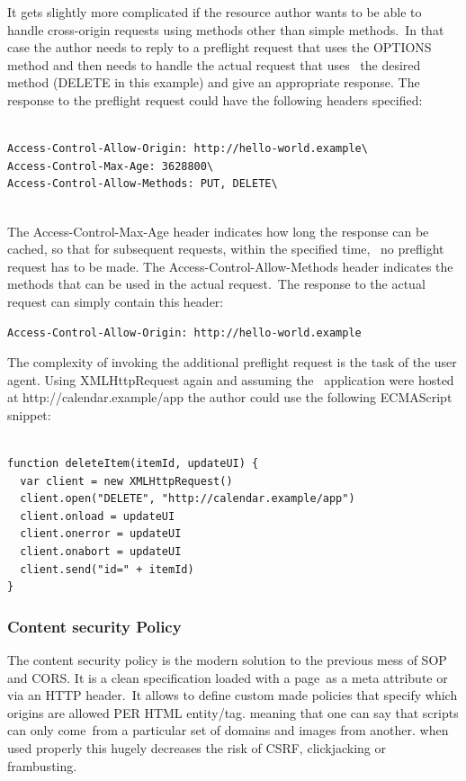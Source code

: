 \documentclass[a4paper,12pt]{paper}
\begin{document}
It gets slightly more complicated if the resource author wants to be able to handle cross-origin requests using methods other than simple methods.\
In that case the author needs to reply to a preflight request that uses the OPTIONS method and then needs to handle the actual request that uses \
the desired method (DELETE in this example) and give an appropriate response. The response to the preflight request could have the following headers specified:\\

\begin{verbatim}

Access-Control-Allow-Origin: http://hello-world.example\
Access-Control-Max-Age: 3628800\
Access-Control-Allow-Methods: PUT, DELETE\
 
\end{verbatim}

The Access-Control-Max-Age header indicates how long the response can be cached, so that for subsequent requests, within the specified time, \
no preflight request has to be made. The Access-Control-Allow-Methods header indicates the methods that can be used in the actual request.\
The response to the actual request can simply contain this header:\\

\begin{verbatim}
Access-Control-Allow-Origin: http://hello-world.example 
\end{verbatim}

The complexity of invoking the additional preflight request is the task of the user agent. Using XMLHttpRequest again and assuming the \
application were hosted at http://calendar.example/app the author could use the following ECMAScript snippet:\\

\begin{verbatim}

function deleteItem(itemId, updateUI) {
  var client = new XMLHttpRequest()
  client.open("DELETE", "http://calendar.example/app")
  client.onload = updateUI
  client.onerror = updateUI
  client.onabort = updateUI
  client.send("id=" + itemId)
} 
\end{verbatim}

\subsubsection{Content security Policy}
\label{CSP}

The content security policy  is the modern solution to the previous mess of SOP and CORS. It is a clean specification loaded with a page\
as a meta attribute or via an HTTP header.\
It allows to define custom made policies that specify which origins are allowed PER HTML entity/tag. meaning that one can say that scripts can only come\
from a particular set of domains and images from another. when used properly this hugely decreases the risk of CSRF, clickjacking or frambusting.\
\end{document}
